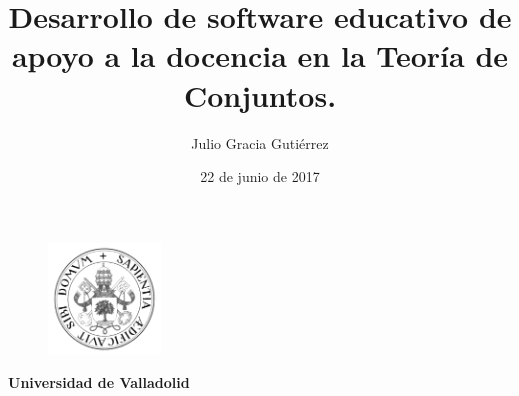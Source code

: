\documentclass[openright,twoside,10pt]{book}
\date{22 de junio de 2017}
\author{Julio Gracia Gutiérrez}
\title{Desarrollo de software educativo de apoyo a la docencia en la Teoría de
Conjuntos.}
\begin{document}
    {
        \selectfont
        \begin{titlepage}
        \begin{center}
            \vspace*{-1in}
            \begin{figure}[htb]
                \begin{center}
                    \includegraphics[width=3cm]{./latex/img/logo}
                \end{center}
            \end{figure}
            \begin{Large}
                \textbf{Universidad de Valladolid}
            \end{Large}


\end{center}
\end{titlepage}}
\end{document}
